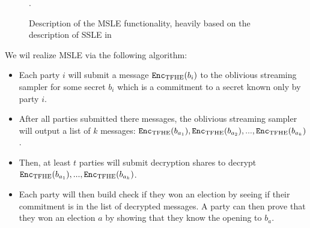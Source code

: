 \begin{figure}[ht]
	\centering
	\caption{Description of the MSLE functionality, heavily based on the description of SSLE in }.
	\label{fig:my_label}
\end{figure}

We wil realize MSLE via the following algorithm:
\begin{itemize}
	\item Each party $i$ will submit a message $\texttt{Enc}_{\mathrm{TFHE}}(b_i)$ to the oblivious streaming sampler for some secret $b_i$ which is a commitment to a secret known only by party $i$.
	\item After all parties submitted there messages, the oblivious streaming sampler will output a list of $k$ messages: $\texttt{Enc}_{\mathrm{TFHE}}(b_{a_1}), \texttt{Enc}_{\mathrm{TFHE}}(b_{a_2}), ..., \texttt{Enc}_{\mathrm{TFHE}}(b_{a_k})$.
	\item Then, at least $t$ parties will submit decryption shares to decrypt $\texttt{Enc}_{\mathrm{TFHE}}(b_{a_1}), ..., \texttt{Enc}_{\mathrm{TFHE}}(b_{a_k})$.
	\item Each party will then build check if they won an election by seeing if their commitment is in the list of decrypted messages.
	A party can then prove that they won an election $a$ by showing that they know the opening to $b_a$.
\end{itemize}


